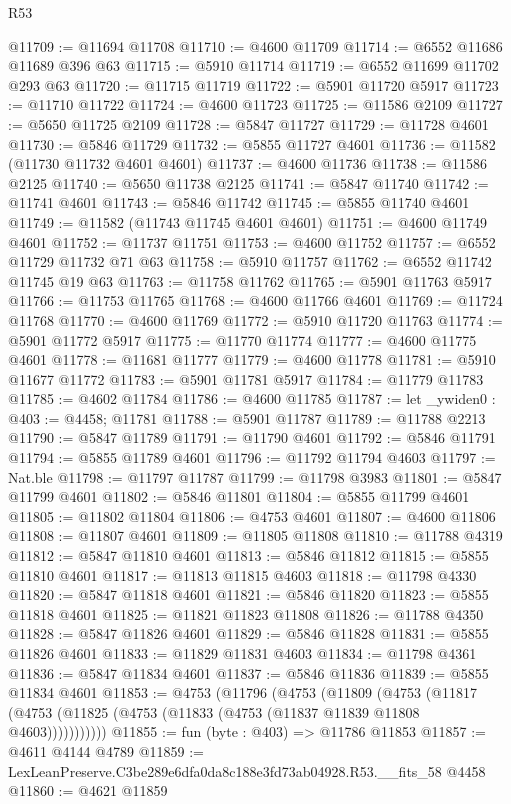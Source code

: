 \begin{lexlean}{R53}
\begin{coremodule}
@11709 := @11694 @11708
@11710 := @4600 @11709
@11714 := @6552 @11686 @11689 @396 @63
@11715 := @5910 @11714
@11719 := @6552 @11699 @11702 @293 @63
@11720 := @11715 @11719
@11722 := @5901 @11720 @5917
@11723 := @11710 @11722
@11724 := @4600 @11723
@11725 := @11586 @2109
@11727 := @5650 @11725 @2109
@11728 := @5847 @11727
@11729 := @11728 @4601
@11730 := @5846 @11729
@11732 := @5855 @11727 @4601
@11736 := @11582 (@11730 @11732 @4601 @4601)
@11737 := @4600 @11736
@11738 := @11586 @2125
@11740 := @5650 @11738 @2125
@11741 := @5847 @11740
@11742 := @11741 @4601
@11743 := @5846 @11742
@11745 := @5855 @11740 @4601
@11749 := @11582 (@11743 @11745 @4601 @4601)
@11751 := @4600 @11749 @4601
@11752 := @11737 @11751
@11753 := @4600 @11752
@11757 := @6552 @11729 @11732 @71 @63
@11758 := @5910 @11757
@11762 := @6552 @11742 @11745 @19 @63
@11763 := @11758 @11762
@11765 := @5901 @11763 @5917
@11766 := @11753 @11765
@11768 := @4600 @11766 @4601
@11769 := @11724 @11768
@11770 := @4600 @11769
@11772 := @5910 @11720 @11763
@11774 := @5901 @11772 @5917
@11775 := @11770 @11774
@11777 := @4600 @11775 @4601
@11778 := @11681 @11777
@11779 := @4600 @11778
@11781 := @5910 @11677 @11772
@11783 := @5901 @11781 @5917
@11784 := @11779 @11783
@11785 := @4602 @11784
@11786 := @4600 @11785
@11787 := let _ywiden0 : @403 := @4458; @11781
@11788 := @5901 @11787
@11789 := @11788 @2213
@11790 := @5847 @11789
@11791 := @11790 @4601
@11792 := @5846 @11791
@11794 := @5855 @11789 @4601
@11796 := @11792 @11794 @4603
@11797 := Nat.ble
@11798 := @11797 @11787
@11799 := @11798 @3983
@11801 := @5847 @11799 @4601
@11802 := @5846 @11801
@11804 := @5855 @11799 @4601
@11805 := @11802 @11804
@11806 := @4753 @4601
@11807 := @4600 @11806
@11808 := @11807 @4601
@11809 := @11805 @11808
@11810 := @11788 @4319
@11812 := @5847 @11810 @4601
@11813 := @5846 @11812
@11815 := @5855 @11810 @4601
@11817 := @11813 @11815 @4603
@11818 := @11798 @4330
@11820 := @5847 @11818 @4601
@11821 := @5846 @11820
@11823 := @5855 @11818 @4601
@11825 := @11821 @11823 @11808
@11826 := @11788 @4350
@11828 := @5847 @11826 @4601
@11829 := @5846 @11828
@11831 := @5855 @11826 @4601
@11833 := @11829 @11831 @4603
@11834 := @11798 @4361
@11836 := @5847 @11834 @4601
@11837 := @5846 @11836
@11839 := @5855 @11834 @4601
@11853 := @4753
    (@11796
      (@4753
        (@11809
          (@4753 (@11817 (@4753 (@11825 (@4753 (@11833 (@4753 (@11837 @11839 @11808 @4603)))))))))))
@11855 := fun (byte : @403) => @11786 @11853
@11857 := @4611 @4144 @4789
@11859 := LexLeanPreserve.C3be289e6dfa0da8c188e3fd73ab04928.R53.__fits_58 @4458
@11860 := @4621 @11859

\end{coremodule}
\end{lexlean}
